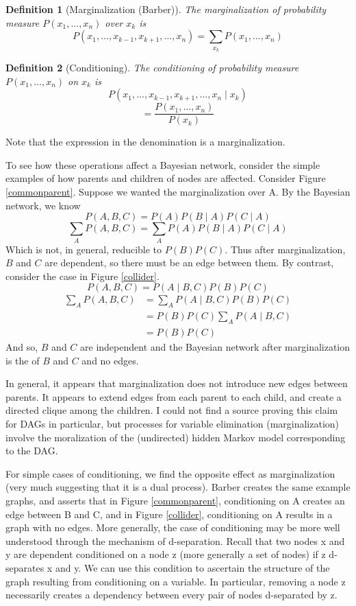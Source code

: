 \documentclass{article}
\newtheorem{definition}{Definition}
\begin{document}
	\begin{definition}[Marginalization (Barber)\cite{barberBRML2012}]
		The marginalization of probability measure $P(x_1, \dots, x_n)$ over $x_k$ is
		$$
		P(x_1,\dots,x_{k-1},x_{k+1},\dots,x_n) = \sum_{x_k}{P(x_1,\dots,x_n)}
		$$
	\end{definition}

	\begin{definition}[Conditioning]
		The conditioning of probability measure $P(x_1, \dots, x_n)$ on $x_k$ is
		$$
		P(x_1,\dots,x_{k-1},x_{k+1},\dots,x_n \mid x_k)$$
		$$ = \frac{P(x_1,\dots,x_n)}{P(x_k)}
		$$
	\end{definition}
	Note that the expression in the denomination is a marginalization.
	
	To see how these operations affect a Bayesian network, consider the simple examples of how parents and children of nodes are affected. Consider Figure \ref{commonparent}. Suppose we wanted the marginalization over A. By the Bayesian network, we know
	$$
	P(A, B, C) = P(A)P(B \mid A)P(C \mid A)
	$$
	$$
	\sum_A{P(A, B, C)} = \sum_A{P(A)P(B \mid A)P(C \mid A)}
	$$
	Which is not, in general, reducible to $P(B)P(C)$. Thus after marginalization, $B$ and $C$ are dependent, so there must be an edge between them. By contrast, consider the case in Figure \ref{collider}.
	$$
	P(A, B, C) = P(A \mid B, C)P(B)P(C)
	$$
	\[
	\begin{array}{ll}
	\sum_A{P(A, B, C)} & = \sum_A{P(A \mid B, C)P(B)P(C)} \\
					   & = P(B)P(C) \sum_A{P(A \mid B, C)} \\
					   & = P(B)P(C)
	\end{array}
	\]
	And so, $B$ and $C$ are independent and the Bayesian network after marginalization is the of $B$ and $C$ and no edges.
	
	In general, it appears that marginalization does not introduce new edges between parents. It appears to extend edges from each parent to each child, and create a directed clique among the children. I could not find a source proving this claim for DAGs in particular, but processes for variable elimination (marginalization) involve the moralization of the (undirected) hidden Markov model corresponding to the DAG\cite{kollerVarElim}.
	
	For simple cases of conditioning, we find the opposite effect as marginalization (very much suggesting that it is a dual process).
	Barber\cite{barberBRML2012} creates the same example graphs, and asserts that in Figure \ref{commonparent}, conditioning on A creates an edge between B and C, and in Figure \ref{collider}, conditioning on A results in a graph with no edges.
	More generally, the case of conditioning may be more well understood through the mechanism of d-separation.
	Recall that two nodes x and y are dependent conditioned on a node z (more generally a set of nodes) if z d-separates x and y.
	We can use this condition to ascertain the structure of the graph resulting from conditioning on a variable.
	In particular, removing a node z necessarily creates a dependency between every pair of nodes d-separated by z.
	
\end{document}
